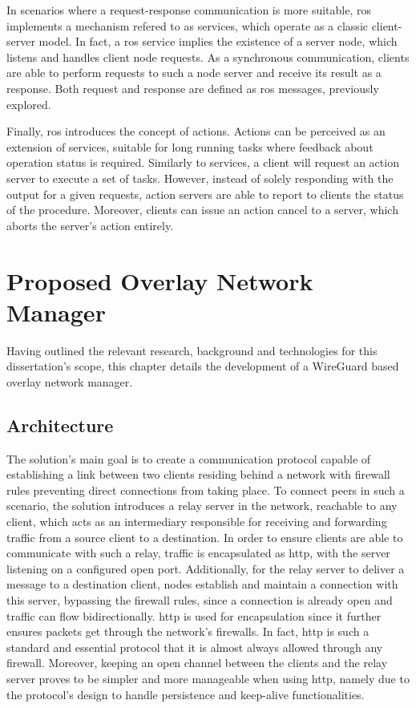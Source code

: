 \documentclass[11pt,twoside,a4paper]{report}
\begin{document}
In scenarios where a request-response communication is more suitable, \ac{ros} implements a mechanism refered to as services, which operate as a classic client-server model. In fact, a \ac{ros} service implies the existence of a server node, which listens and handles client node requests. As a synchronous communication, clients are able to perform requests to such a node server and receive its result as a response. Both request and response are defined as \ac{ros} messages, previously explored.

Finally, \ac{ros} introduces the concept of actions. Actions can be perceived as an extension of services, suitable for long running tasks where feedback about operation status is required. Similarly to services, a client will request an action server to execute a set of tasks. However, instead of solely responding with the output for a given requests, action servers are able to report to clients the status of the procedure. Moreover, clients can issue an action cancel to a server, which aborts the server's action entirely.

\chapter{Proposed Overlay Network Manager}

Having outlined the relevant research, background and technologies for this dissertation's scope, this chapter details the development of a WireGuard based overlay network manager.

\section{Architecture}

The solution's main goal is to create a communication protocol capable of establishing a link between two clients residing behind a network with firewall rules preventing direct connections from taking place. To connect peers in such a scenario, the solution introduces a relay server in the network, reachable to any client, which acts as an intermediary responsible for receiving and forwarding traffic from a source client to a destination. In order to ensure clients are able to communicate with such a relay, traffic is encapsulated as \ac{http}, with the server listening on a configured open port. Additionally, for the relay server to deliver a message to a destination client, nodes establish and maintain a connection with this server, bypassing the firewall rules, since a connection is already open and traffic can flow bidirectionally. \ac{http} is used for encapsulation since it further ensures packets get through the network's firewalls. In fact, \ac{http} is such a standard and essential protocol that it is almost always allowed through any firewall. Moreover, keeping an open channel between the clients and the relay server proves to be simpler and more manageable when using \ac{http}, namely due to the protocol's design to handle persistence and keep-alive functionalities.
\end{document}
